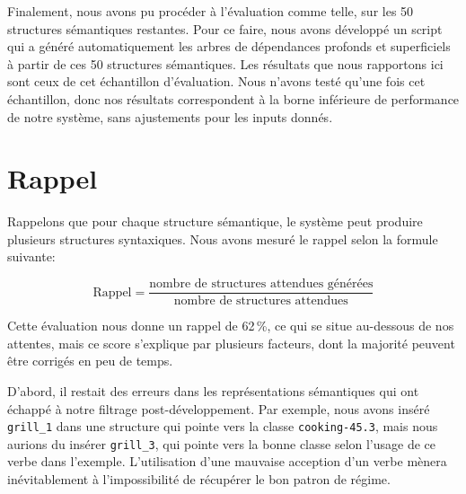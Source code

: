 Finalement, nous avons pu procéder à l'évaluation comme telle, sur les 50 structures sémantiques restantes. Pour ce faire, nous avons développé un script qui a généré automatiquement les arbres de dépendances profonds et superficiels à partir de ces 50 structures sémantiques. Les résultats que nous rapportons ici sont ceux de cet échantillon d'évaluation. Nous n'avons testé qu'une fois cet échantillon, donc nos résultats correspondent à la borne inférieure de performance de notre système, sans ajustements pour les inputs donnés.
                              
\section{Rappel}

Rappelons que pour chaque structure sémantique, le système peut produire plusieurs structures syntaxiques. Nous avons mesuré le rappel selon la formule suivante:


\[\text{Rappel} = \frac{\text{nombre de structures attendues générées}}{\text{nombre de structures attendues}}\]

Cette évaluation nous donne un rappel de 62\,\%, ce qui se situe au-dessous de nos attentes, mais ce score s'explique par plusieurs facteurs, dont la majorité peuvent être corrigés en peu de temps. 

D'abord, il restait des erreurs dans les représentations sémantiques qui ont échappé à notre filtrage post-développement. Par exemple, nous avons inséré \texttt{grill\_1} dans une structure qui pointe vers la classe \texttt{cooking-45.3}, mais nous aurions du insérer \texttt{grill\_3}, qui pointe vers la bonne classe selon l'usage de ce verbe dans l'exemple. L'utilisation d'une mauvaise acception d'un verbe mènera inévitablement à l'impossibilité de récupérer le bon patron de régime.

